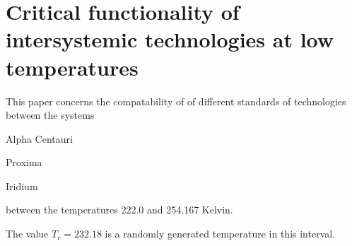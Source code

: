 


    \section{Critical functionality of intersystemic technologies at low temperatures}
    \author{Max Mustermann}

    This paper concerns the compatability of
    of different standards of technologies between the systems

    \begin{itemise}
    \item Alpha Centauri
    \item Proxima
    \item Iridium
    \end{itemise}

    between the temperatures 222.0 and 254.167 Kelvin.

    The value $T_{r}=232.18$ is a randomly generated temperature in this interval.


